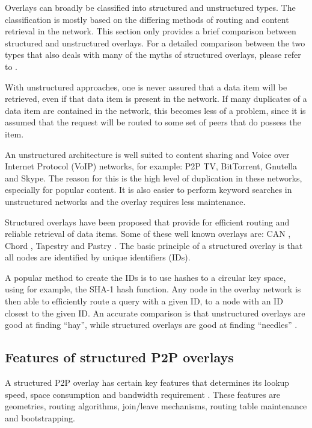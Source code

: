 Overlays can broadly be classified into structured and unstructured types. The classification is mostly based on the differing methods of routing and content retrieval in the network. This section only provides a brief comparison between structured and unstructured overlays. For a detailed comparison between the two types that also deals with many of the myths of structured overlays, please refer to \cite{Castro_structured_overlay_myths}.

With unstructured approaches, one is never assured that a data item will be retrieved, even if that data item is present in the network. If many duplicates of a data item are contained in the network, this becomes less of a problem, since it is assumed that the request will be routed to some set of peers that do  possess the item.

An unstructured architecture is well suited to content sharing and Voice over Internet Protocol (VoIP) networks, for example: P2P TV, BitTorrent, Gnutella and Skype. The reason for this is the high level of duplication in these networks, especially for popular content. It is also easier to perform keyword searches in unstructured networks and the overlay requires less maintenance.

Structured overlays have been proposed that provide for efficient routing and reliable retrieval of data items. Some of these well known overlays are: CAN \cite{CAN}, Chord \cite{chord}, Tapestry \cite{tapestry} and Pastry \cite{pastry}. The basic principle of a structured overlay is that all nodes are identified by unique identifiers (IDs).

A popular method to create the IDs is to use hashes to a circular key space, using for example, the SHA-1 hash function. Any node in the overlay network is then able to efficiently route a query with a given ID, to a node with an ID closest to the given ID. An accurate comparison is that unstructured overlays are good at finding ``hay'', while structured overlays are good at finding ``needles'' \cite{Rodrigues_acm_comms_p2p}.

\subsection{Features of structured P2P overlays}
\label{structured_overlay_features}

A structured P2P overlay has certain key features that determines its lookup speed, space consumption and bandwidth requirement \cite{p2p_networking_handbook}. These features are geometries, routing algorithms, join/leave mechanisms, routing table maintenance and bootstrapping.

